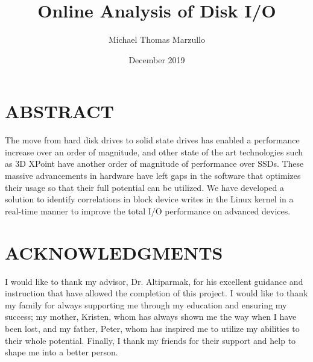 \documentclass[MEng]{uofl}
\begin{document}
\title{Online Analysis of Disk I/O}
\author{Michael Thomas Marzullo}


\date{December 2019}
\maketitle

\chapter*{ABSTRACT}
The move from hard disk drives to solid state drives has enabled a performance increase over an order of magnitude, 
and other state of the art technologies such as 3D XPoint have another order of magnitude of performance over SSDs. 
These massive advancements in hardware have left gaps in the software that optimizes their usage so that their full 
potential can be utilized. We have developed a solution to identify correlations in block device writes in the Linux 
kernel in a real-time manner to improve the total I/O performance on advanced devices.

\chapter*{ACKNOWLEDGMENTS}
I would like to thank my advisor, Dr. Altiparmak, for his excellent guidance 
and instruction that have allowed the completion of this project. I would like to 
thank my family for always supporting me through my education and ensuring my 
success; my mother, Kristen, whom has always shown me the way when I have been 
lost, and my father, Peter, whom has inspired me to utilize my abilities to their
whole potential. Finally, I thank my friends for their support and help to shape me 
into a better person.
\end{document}
